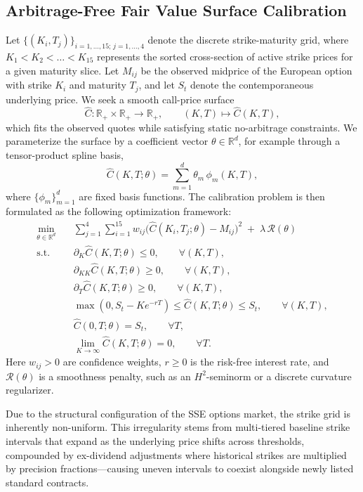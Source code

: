 \documentclass[11pt, a4paper]{article}
\begin{document}
\subsection{Arbitrage-Free Fair Value Surface Calibration}
Let \(\{(K_i,T_j)\}_{i=1,\dots,15;\,j=1,\dots,4}\) denote the discrete strike-maturity grid, where \(K_1 < K_2 < \dots < K_{15}\) represents the sorted cross-section of active strike prices for a given maturity slice. Let \(M_{ij}\) be the observed midprice of the European option with strike \(K_i\) and maturity \(T_j\), and let \(S_t\) denote the contemporaneous underlying price. We seek a smooth call-price surface
\[
\widehat{C}:\mathbb{R}_+\times \mathbb{R}_+ \to \mathbb{R}_+,
\qquad (K,T)\mapsto \widehat{C}(K,T),
\]
which fits the observed quotes while satisfying static no-arbitrage constraints. We parameterize the surface by a coefficient vector \(\theta \in \mathbb{R}^d\), for example through a tensor-product spline basis,
\[
\widehat{C}(K,T;\theta)=\sum_{m=1}^d \theta_m \,\phi_m(K,T),
\]
where \(\{\phi_m\}_{m=1}^d\) are fixed basis functions. The calibration problem is then formulated as the following optimization framework:
\begin{equation}
\label{eq:surface-calibration}
\begin{aligned}
\min_{\theta \in \mathbb{R}^d}\quad
& \sum_{j=1}^{4}\sum_{i=1}^{15} w_{ij}\Big(\widehat{C}(K_i,T_j;\theta)-M_{ij}\Big)^2
\;+\;\lambda\,\mathcal{R}(\theta) \\
\text{s.t.}\quad
& \partial_K \widehat{C}(K,T;\theta)\le 0, \qquad \forall (K,T), \\
& \partial_{KK} \widehat{C}(K,T;\theta)\ge 0, \qquad \forall (K,T), \\
& \partial_T \widehat{C}(K,T;\theta)\ge 0, \qquad \forall (K,T), \\
& \max(0, S_t - K e^{-r T}) \le \widehat{C}(K,T;\theta) \le S_t, \qquad \forall (K,T), \\
& \widehat{C}(0,T;\theta)=S_t, \qquad \forall T, \\
& \lim_{K\to\infty}\widehat{C}(K,T;\theta)=0, \qquad \forall T.
\end{aligned}
\end{equation}
Here \(w_{ij}>0\) are confidence weights, \(r \ge 0\) is the risk-free interest rate, and \(\mathcal{R}(\theta)\) is a smoothness penalty, such as an \(H^2\)-seminorm or a discrete curvature regularizer. 

Due to the structural configuration of the SSE options market, the strike grid is inherently non-uniform. This irregularity stems from multi-tiered baseline strike intervals that expand as the underlying price shifts across thresholds, compounded by ex-dividend adjustments where historical strikes are multiplied by precision fractions—causing uneven intervals to coexist alongside newly listed standard contracts. 
\end{document}
